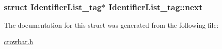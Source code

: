 \subsubsection[{next}]{\setlength{\rightskip}{0pt plus 5cm}struct {\bf Identifier\+List\+\_\+tag}$\ast$ Identifier\+List\+\_\+tag\+::next}\label{struct_identifier_list__tag_ab078cbf07ee9896784b46a0dca4ccb2d}


The documentation for this struct was generated from the following file\+:\begin{DoxyCompactItemize}
\item 
\hyperlink{crowbar_8h}{crowbar.\+h}\end{DoxyCompactItemize}
